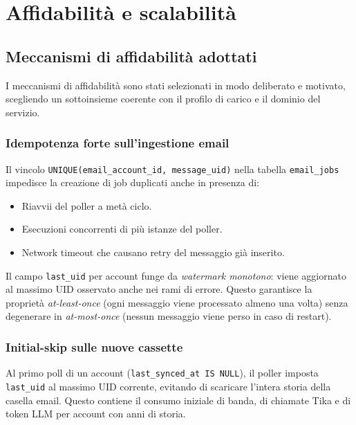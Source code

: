 \chapter{Affidabilit\`a e scalabilit\`a}
\label{chap:reliability}

\section{Meccanismi di affidabilit\`a adottati}
\label{sec:reliability_meccanismi}

I meccanismi di affidabilit\`a sono stati selezionati in modo deliberato e motivato,
scegliendo un sottoinsieme coerente con il profilo di carico e il dominio del servizio.

\subsection{Idempotenza forte sull'ingestione email}

Il vincolo \texttt{UNIQUE(email\_account\_id, message\_uid)} nella tabella
\texttt{email\_jobs} impedisce la creazione di job duplicati anche in presenza di:
\begin{itemize}[leftmargin=*]
    \item Riavvii del poller a met\`a ciclo.
    \item Esecuzioni concorrenti di pi\`u istanze del poller.
    \item Network timeout che causano retry del messaggio gi\`a inserito.
\end{itemize}

Il campo \texttt{last\_uid} per account funge da \emph{watermark monotono}: viene
aggiornato al massimo UID osservato anche nei rami di errore. Questo garantisce la
propriet\`a \emph{at-least-once} (ogni messaggio viene processato almeno una volta)
senza degenerare in \emph{at-most-once} (nessun messaggio viene perso in caso di
restart).

\subsection{Initial-skip sulle nuove cassette}

Al primo poll di un account (\texttt{last\_synced\_at IS NULL}), il poller imposta
\texttt{last\_uid} al massimo UID corrente, evitando di scaricare l'intera storia della
casella email. Questo contiene il consumo iniziale di banda, di chiamate Tika e di
token LLM per account con anni di storia.

